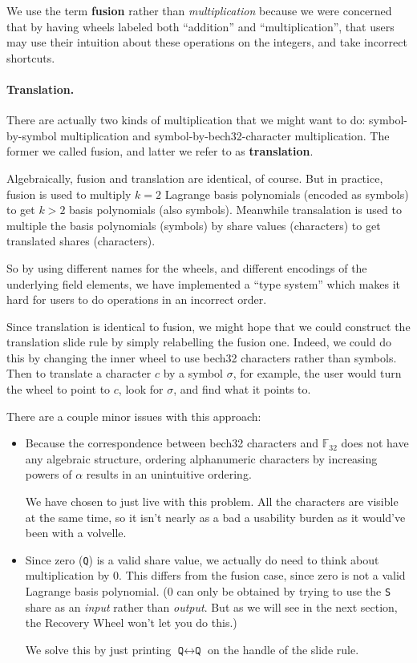 \documentclass[letterpaper]{article}
\newcommand{\fttwo}{\mathbb{F}_{32}}
\newcommand{\vc}[1]{\texttt{#1}} %
\begin{document}
We use the term \textbf{fusion} rather than \emph{multiplication} because we were
concerned that by having wheels labeled both ``addition'' and ``multiplication'',
that users may use their intuition about these operations on the integers, and
take incorrect shortcuts.

\paragraph{Translation.} There are actually two kinds of multiplication that
we might want to do: symbol-by-symbol multiplication and symbol-by-bech32-character
multiplication. The former we called fusion, and latter we refer to as
\textbf{translation}.

Algebraically, fusion and translation are identical, of course. But in
practice, fusion is used to multiply $k=2$ Lagrange basis polynomials
(encoded as symbols) to get $k>2$ basis polynomials (also symbols).
Meanwhile transalation is used to multiple the basis polynomials (symbols) by
share values (characters) to get translated shares (characters).

So by using different names for the wheels, and different encodings of the
underlying field elements, we have implemented a ``type system'' which makes
it hard for users to do operations in an incorrect order.

Since translation is identical to fusion, we might hope that we could
construct the translation slide rule by simply relabelling the fusion one.
Indeed, we could do this by changing the inner wheel to use bech32 characters
rather than symbols. Then to translate a character $c$ by a symbol $\sigma$,
for example, the user would turn the wheel to point to $c$, look for
$\sigma$, and find what it points to.

There are a couple minor issues with this approach:
\begin{itemize}
\item Because the correspondence between bech32 characters and $\fttwo$
does not have any algebraic structure, ordering alphanumeric characters by
increasing powers of $\alpha$ results in an unintuitive ordering.

We have chosen to just live with this problem. All the characters are visible
at the same time, so it isn't nearly as a bad a usability burden as it would've
been with a volvelle.
\item Since zero (\vc{Q}) is a valid share value, we actually do need to think
about multiplication by 0. This differs from the fusion case, since zero is not
a valid Lagrange basis polynomial. (0 can only be obtained by trying to use the
\vc{S} share as an \emph{input} rather than \emph{output}. But as we will see
in the next section, the Recovery Wheel won't let you do this.)

We solve this by just printing $\vc{Q}\leftrightarrow\vc{Q}$ on the handle of
the slide rule.
\end{itemize}
\end{document}
